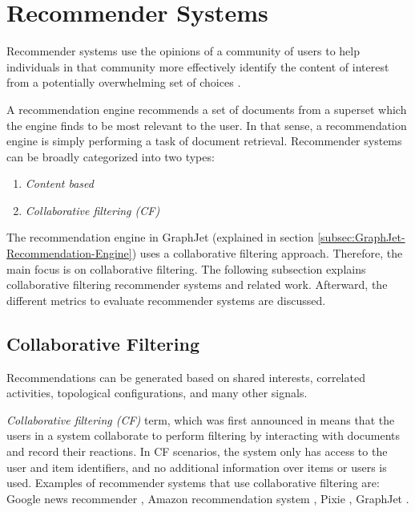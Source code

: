 \section{Recommender Systems}
\label{sec:recommender-systems}

Recommender systems use the opinions of a community of users to help individuals in that community more effectively identify the content of interest from a potentially overwhelming set of choices \cite{resnick1997recommender}.

A recommendation engine recommends a set of documents from a superset which the engine finds to be most relevant to the user. In that sense, a recommendation engine is simply performing a task of document retrieval. Recommender systems can be broadly categorized into two types:
\begin{enumerate}
    \item \emph{Content based}
    \item \emph{Collaborative filtering (CF)}
\end{enumerate}
The recommendation engine in GraphJet \cite{sharma2016graphjet} (explained in section \ref{subsec:GraphJet-Recommendation-Engine}) uses a collaborative filtering approach. Therefore, the main focus is on collaborative filtering. The following subsection explains collaborative filtering recommender systems and related work. Afterward, the different metrics to evaluate recommender systems are discussed.

\subsection{Collaborative Filtering}
\label{subsec:collaborative-filtering}

Recommendations can be generated based on shared interests, correlated activities, topological configurations, and many other signals.

\emph{Collaborative filtering (CF)} term, which was first announced in \cite{goldberg1992using} means that the users in a system collaborate to perform filtering by interacting with documents and record their reactions.
In CF scenarios, the system only has access to the user and item identifiers, and no additional information over items or users is used.
Examples of recommender systems that use collaborative filtering are: Google news recommender \cite{das2007google}, Amazon recommendation system \cite{linden2003amazon}, Pixie \cite{eksombatchai2018pixie}, GraphJet \cite{sharma2016graphjet}.

